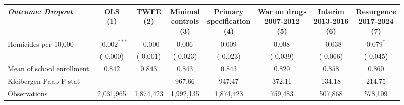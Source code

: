 \begin{tabular}{l c c c c c c c}
\hline\hline
 {\small \textit{Outcome: Dropout}} & \shortstack{OLS \\ (1)} & \shortstack{TWFE \\ (2)} & \shortstack{Minimal \\ controls \\ (3)} & \shortstack{Primary \\ specification \\ (4)} & \shortstack{War on drugs \\ 2007-2012 \\ (5)} & \shortstack{Interim \\ 2013-2016 \\ (6)} & \shortstack{Resurgence \\ 2017-2024 \\  (7)} \\
\hline
Homicides per 10,000
 & $-0.002^{***}$ & $-0.000^{}$ & $ 0.006^{}$ & $ 0.009^{}$ & $ 0.008^{}$ & $-0.038^{}$ & $ 0.079^{*}$  \\
 & ( 0.000) & ( 0.001) & ( 0.023) & ( 0.023) & ( 0.039)& ( 0.066) & ( 0.045)  \\
\hline
Mean of school enrollment
 & $ 0.842$ & $ 0.843$ & $ 0.843$ & $ 0.843$ & $ 0.820$ & $ 0.858$ & $ 0.860$ \\
Kleibergen-Paap F-stat
 & -- & -- & 967.66 & 947.47 & 372.11 & 134.18 & 214.75 \\
\hline
Observations
 & 2,031,965 & 1,874,423 & 1,992,135 & 1,874,423 &   759,483 &   507,868 &   578,109 \\
\hline\hline
\end{tabular}

